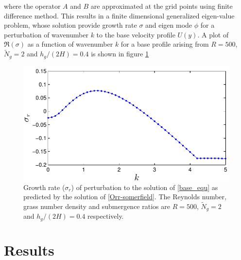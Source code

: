 \documentclass[12pt]{report}   %
\newcommand{\Ndg}{\tilde{N}_g}
\begin{document}
where the operator $A$ and $B$ are approximated at the grid points using finite difference method. This results in a finite dimensional generalized eigen-value problem, whose solution provide growth rate $\sigma$ and eigen mode $\phi$ for a perturbation of wavenumber $k$ to the base velocity profile $U(y)$. A plot of $\Re(\sigma)$ as a function of wavenumber $k$ for a base profile arising from $R=500$, $\Ndg=2$ and $h_g/(2H)=0.4$ is shown in figure \ref{GrowthRateVsK} 

\begin{figure}
 \centerline{\includegraphics{GrowthrateVsK}}
 \caption[Growth rate ($\sigma_r$) of perturbation to the solution of \eqref{base_equ} as predicted by the solution of \eqref{Orr-somerfield}]{Growth rate ($\sigma_r$) of perturbation to the solution of \eqref{base_equ} as predicted by the solution of \eqref{Orr-somerfield}. The  Reynolds number, grass number density and submergence ratios are $R=500$, $\Ndg=2$ and $h_{g}/(2H) = 0.4$ respectively. }
 \label{GrowthRateVsK}
\end{figure}


%
\clearpage{\pagestyle{empty}\cleardoublepage}

\section{Results}
\end{document}
